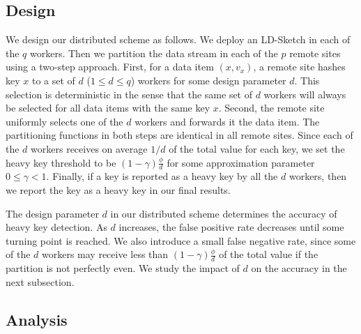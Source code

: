 \subsection{Design}

We design our distributed scheme as follows.  We deploy an LD-Sketch in
each of the $q$ workers.  Then we partition the data stream in each of the $p$
remote sites using a two-step approach.  First, for a data item $(x,v_x)$, a
remote
site hashes key $x$ to a set of $d$ ($1\le d\le q$) workers for some design
parameter $d$.  This selection is deterministic in the sense that the same set
of $d$ workers will always be selected for all data items with the same key
$x$.  Second, the remote site uniformly selects one of the $d$ workers and
forwards it the data item.  The partitioning functions in both steps are
identical in all remote sites.  Since each of the $d$ workers receives on
average $1/d$ of the total value for each key, we set the heavy key threshold
to be $(1-\gamma)\frac{\phi}{d}$ for some approximation parameter 
$0\le \gamma <1$.
Finally, if a key is reported as a heavy key by all the $d$ workers, then we
report the key as a heavy key in our final results.

The design parameter $d$ in our distributed scheme determines the accuracy of
heavy key detection.  
As $d$ increases, the false positive rate decreases until some turning point
is reached.  We also introduce a small false negative rate, since some of the
$d$ workers may receive less than $(1-\gamma)\frac{\phi}{d}$ of the total
value if the partition is not perfectly even.  We study the impact of $d$ on
the accuracy in the next subsection.

\subsection{Analysis}
\label{subsec:dist_analysis}



